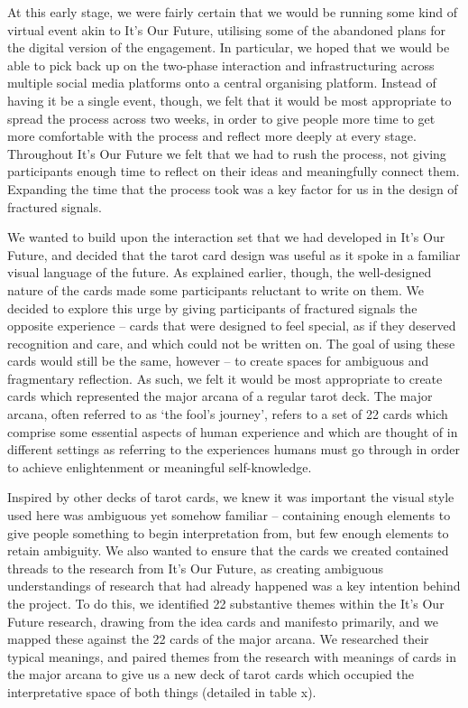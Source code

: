 At this early stage, we were fairly certain that we would be running some kind of virtual event akin to It’s Our Future, utilising some of the abandoned plans for the digital version of the engagement. In particular, we hoped that we would be able to pick back up on the two-phase interaction and infrastructuring across multiple social media platforms onto a central organising platform. Instead of having it be a single event, though, we felt that it would be most appropriate to spread the process across two weeks, in order to give people more time to get more comfortable with the process and reflect more deeply at every stage. Throughout It’s Our Future we felt that we had to rush the process, not giving participants enough time to reflect on their ideas and meaningfully connect them. Expanding the time that the process took was a key factor for us in the design of fractured signals. 

We wanted to build upon the interaction set that we had developed in It’s Our Future, and decided that the tarot card design was useful as it spoke in a familiar visual language of the future. As explained earlier, though, the well-designed nature of the cards made some participants reluctant to write on them. We decided to explore this urge by giving participants of fractured signals the opposite experience – cards that were designed to feel special, as if they deserved recognition and care, and which could not be written on. The goal of using these cards would still be the same, however – to create spaces for ambiguous and fragmentary reflection. As such, we felt it would be most appropriate to create cards which represented the major arcana of a regular tarot deck. The major arcana, often referred to as ‘the fool’s journey’, refers to a set of 22 cards which comprise some essential aspects of human experience and which are thought of in different settings as referring to the experiences humans must go through in order to achieve enlightenment or meaningful self-knowledge. 

Inspired by other decks of tarot cards, we knew it was important the visual style used here was ambiguous yet somehow familiar – containing enough elements to give people something to begin interpretation from, but few enough elements to retain ambiguity. We also wanted to ensure that the cards we created contained threads to the research from It’s Our Future, as creating ambiguous understandings of research that had already happened was a key intention behind the project. To do this, we identified 22 substantive themes within the It’s Our Future research, drawing from the idea cards and manifesto primarily, and we mapped these against the 22 cards of the major arcana. We researched their typical meanings, and paired themes from the research with meanings of cards in the major arcana to give us a new deck of tarot cards which occupied the interpretative space of both things (detailed in table x).

